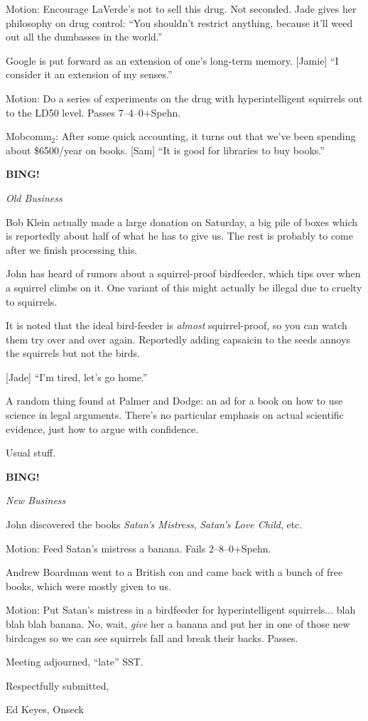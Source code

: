\documentclass[12pt]{article}
\newcommand{\bing}{{\bf BING!} }
\newcommand{\goto}[1]{\bing \vskip 12pt \centerline{{\em{#1}}}}
\begin{document}
Motion: Encourage LaVerde's not to sell this drug.  Not seconded.
Jade gives her philosophy on drug control: ``You shouldn't restrict
anything, because it'll weed out all the dumbasses in the world.''

Google is put forward as an extension of one's long-term memory.
[Jamie] ``I consider it an extension of my senses.''

Motion: Do a series of experiments on the drug with hyperintelligent
squirrels out to the LD50 level.  Passes 7--4--0+Spehn.

Mobcomm$_2$: After some quick accounting, it turns out that we've
been spending about \$6500/year on books.  [Sam] ``It is good for
libraries to buy books.''

\goto{Old Business}

Bob Klein actually made a large donation on Saturday, a big pile
of boxes which is reportedly about half of what he has to give us.
The rest is probably to come after we finish processing this.

John has heard of rumors about a squirrel-proof birdfeeder, which tips
over when a squirrel climbs on it.  One variant of this might actually
be illegal due to cruelty to squirrels.

It is noted that the ideal bird-feeder is {\em almost} squirrel-proof,
so you can watch them try over and over again.  Reportedly adding
capsaicin to the seeds annoys the squirrels but not the birds.

[Jade] ``I'm tired, let's go home.''

A random thing found at Palmer and Dodge: an ad for a book on how to
use science in legal arguments.  There's no particular emphasis on
actual scientific evidence, just how to argue with confidence.

Usual stuff.

\goto{New Business}

John discovered the books {\em Satan's Mistress}, {\em Satan's Love
Child}, etc.

Motion: Feed Satan's mistress a banana.  Fails 2--8--0+Spehn.

Andrew Boardman went to a British con and came back with a bunch
of free books, which were mostly given to us.

Motion: Put Satan's mistress in a birdfeeder for hyperintelligent
squirrels... blah blah blah banana.  No, wait, {\em give} her a banana
and put her in one of those new birdcages so we can see squirrels fall
and break their backs.  Passes.

\vspace{12pt}

\noindent
Meeting adjourned, ``late'' SST.

\vspace{18pt}

\centerline{Respectfully submitted,}
\centerline{Ed Keyes, Onseck}
\end{document}
